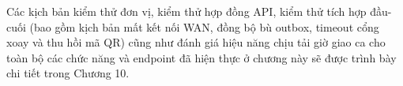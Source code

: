 Các kịch bản kiểm thử đơn vị, kiểm thử hợp đồng API, kiểm thử tích hợp đầu-cuối (bao gồm kịch bản
mất kết nối WAN, đồng bộ bù outbox, timeout cổng xoay và thu hồi mã QR) cũng như đánh giá hiệu năng
chịu tải giờ giao ca cho toàn bộ các chức năng và endpoint đã hiện thực ở chương này sẽ được trình
bày chi tiết trong Chương 10.
